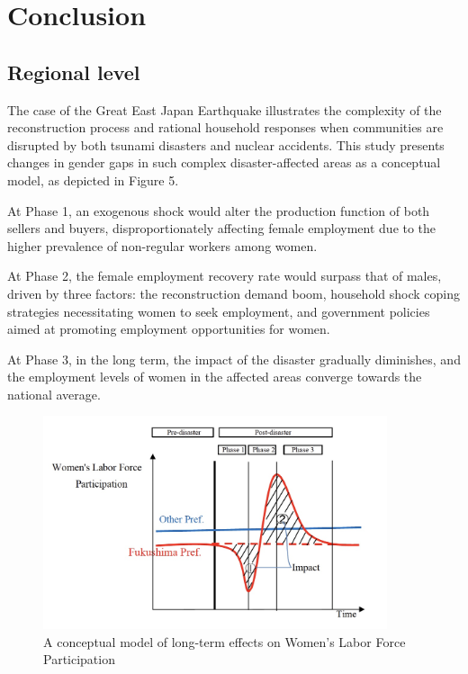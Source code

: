\documentclass[12pt,halfline,a4paper]{ouparticle}
\begin{document}
\newpage

\section{Conclusion}
\label{sec5}

\subsection{Regional level}
\label{sec5.1}

The case of the Great East Japan Earthquake illustrates the complexity of the reconstruction process and rational household responses when communities are disrupted by both tsunami disasters and nuclear accidents. This study presents changes in gender gaps in such complex disaster-affected areas as a conceptual model, as depicted in Figure 5.


At Phase 1, an exogenous shock would alter the production function of both sellers and buyers, disproportionately affecting female employment due to the higher prevalence of non-regular workers among women.

At Phase 2, the female employment recovery rate would surpass that of males, driven by three factors: the reconstruction demand boom, household shock coping strategies necessitating women to seek employment, and government policies aimed at promoting employment opportunities for women.

At Phase 3, in the long term, the impact of the disaster gradually diminishes, and the employment levels of women in the affected areas converge towards the national average.


\begin{figure}[h!]
    \centering
    \includegraphics[width=0.9\textwidth]{A conceptual model.jpeg}  %
    \caption{A conceptual model of long-term effects on Women's Labor Force Participation}
    \label{fig:conceptual_model}
\end{figure}
\end{document}
